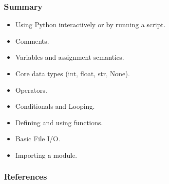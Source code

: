 \documentclass{beamer}
\begin{document}
\begin{frame}[fragile]
\frametitle{Summary}
\begin{itemize}
\item Using Python interactively or by running a script.
\item Comments.
\item Variables and assignment semantics.
\item Core data types (int, float, str, None).
\item Operators.
\item Conditionals and Looping.
\item Defining and using functions.
\item Basic File I/O.
\item Importing a module.
\end{itemize}
\end{frame}

\begin{frame}%
  \frametitle{References}
  
  \scriptsize
  
\end{frame}
\end{document}

